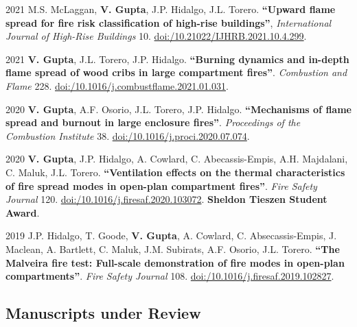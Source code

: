 \documentclass[12pt,letterpaper]{report}
\begin{document}
\begin{tablist}
	\item[2021] \tab M.S. McLaggan, \textbf{V. Gupta}, J.P. Hidalgo, J.L. Torero. 	\textbf{\enquote{Upward flame spread for fire risk classification of high-rise buildings}}, 	\textit{International Journal of High-Rise Buildings} 10. \href{https://doi.org/10.21022/IJHRB.2021.10.4.299}{doi:/10.21022/IJHRB.2021.10.4.299}.

    \item[2021] \tab \textbf{V. Gupta}, J.L. Torero, J.P. Hidalgo. \textbf{\enquote{Burning dynamics and in-depth flame spread of wood cribs in large compartment fires}}. \textit{Combustion and Flame} 228. \href{https://doi.org/10.1016/j.combustflame.2021.01.031}{doi:/10.1016/j.combustflame.2021.01.031}. 

	\item[2020] \tab \textbf{V. Gupta}, A.F. Osorio, J.L. Torero, J.P. Hidalgo. \textbf{\enquote{Mechanisms of flame spread and burnout in large enclosure fires}}. \textit{Proceedings of the Combustion Institute} 38. \href{https://doi.org/10.1016/j.proci.2020.07.074}{doi:/10.1016/j.proci.2020.07.074}.
    	
    \item[2020] \tab \textbf{V. Gupta}, J.P. Hidalgo, A. Cowlard, C. Abecassis-Empis, A.H. Majdalani, C. Maluk, J.L. Torero. \textbf{\enquote{Ventilation effects on the thermal characteristics of fire spread modes in open-plan compartment fires}}. \textit{Fire Safety Journal} 120. \href{https://doi.org/10.1016/j.firesaf.2020.103072}{doi:/10.1016/j.firesaf.2020.103072}. \textbf{Sheldon Tieszen Student Award}. 
    	
    \item[2019] \tab J.P. Hidalgo, T. Goode, \textbf{V. Gupta}, A. Cowlard, C. Absecassis-Empis, J. Maclean, A. Bartlett, C. Maluk, J.M. Subirats, A.F. Osorio, J.L. Torero. \textbf{\enquote{The Malveira fire test: Full-scale demonstration of fire modes in open-plan compartments}}. \textit{Fire Safety Journal} 108. \href{https://doi.org/10.1016/j.firesaf.2019.102827}{doi:/10.1016/j.firesaf.2019.102827}.

	\end{tablist}

    \subsection*{Manuscripts under Review}
\end{document}
